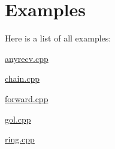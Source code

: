 \section{Examples}
Here is a list of all examples\+:\begin{DoxyCompactItemize}
\item 
\hyperlink{anyrecv_8cpp-example}{anyrecv.\+cpp}
\item 
\hyperlink{chain_8cpp-example}{chain.\+cpp}
\item 
\hyperlink{forward_8cpp-example}{forward.\+cpp}
\item 
\hyperlink{gol_8cpp-example}{gol.\+cpp}
\item 
\hyperlink{ring_8cpp-example}{ring.\+cpp}
\end{DoxyCompactItemize}
